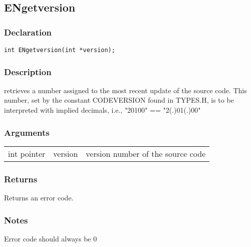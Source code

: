 \subsection{ENgetversion}
\subsubsection{Declaration}
\begin{lstlisting}
int ENgetversion(int *version);
\end{lstlisting}
\subsubsection{Description}
retrieves a number assigned to the most recent
update of the source code. This number, set by the
constant CODEVERSION found in TYPES.H, is to be
interpreted with implied decimals, i.e., "20100" == "2(.)01(.)00"
\subsubsection{Arguments}
\begin{tabular}{l r p{11cm} }
int pointer&version&version number of the source code\\[6pt]
\end{tabular}
\subsubsection{Returns}
Returns an error code.
\subsubsection{Notes}
Error code should always be 0